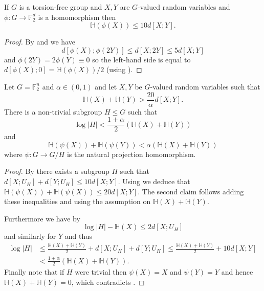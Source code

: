 \begin{lemma}\label{torsion-dist-shrinking}\leanok
If $G$ is a torsion-free group and $X,Y$ are $G$-valued random variables and $\phi:G\to \mathbb{F}_2^d$ is a homomorphism then
\[\mathbb{H}(\phi(X))\leq 10d[X;Y].\]
\end{lemma}
\begin{proof}
\leanok
By  and  we have
\[d[\phi(X);\phi(2Y)]\leq d[X;2Y]\leq 5d[X;Y]\]
and $\phi(2Y)=2\phi(Y)\equiv 0$ so the left-hand side is equal to $d[\phi(X);0]=\mathbb{H}(\phi(X))/2$ (using ).
\end{proof}

\begin{lemma}\label{app-ent-pfr}\leanok
Let $G=\mathbb{F}_2^n$ and $\alpha\in (0,1)$ and let $X,Y$ be $G$-valued
random variables such that
\[\mathbb{H}(X)+\mathbb{H}(Y)> \frac{20}{\alpha} d[X;Y].\]
There is a non-trivial subgroup $H\leq G$ such that
\[\log \lvert H\rvert <\frac{1+\alpha}{2}(\mathbb{H}(X)+\mathbb{H}(Y))\] and
\[\mathbb{H}(\psi(X))+\mathbb{H}(\psi(Y))< \alpha (\mathbb{H}(X)+\mathbb{H}(Y))\]
where $\psi:G\to G/H$ is the natural projection homomorphism.
\end{lemma}
\begin{proof}
\leanok
By  there exists a subgroup $H$ such that
$d[X;U_H] + d[Y;U_H] \leq 10 d[X;Y]$. Using  we
deduce that $\mathbb{H}(\psi(X)) + \mathbb{H}(\psi(X)) \leq 20 d[X;Y]$. The
second claim follows adding these inequalities and using the assumption on
$\mathbb{H}(X)+\mathbb{H}(Y)$.

Furthermore we have by 
\[\log \lvert H \rvert-\mathbb{H}(X)\leq 2d[X;U_H]\]
and similarly for $Y$ and thus
\begin{align*}
\log \lvert  H\rvert
&\leq
\frac{\mathbb{H}(X)+\mathbb{H}(Y)}{2}+d[X;U_H] + d[Y;U_H] \leq
\frac{\mathbb{H}(X)+\mathbb{H}(Y)}{2}+ 10d[X;Y]
\\& <
\frac{1+\alpha}{2}(\mathbb{H}(X)+\mathbb{H}(Y)).
\end{align*}
Finally note that if $H$
were trivial then $\psi(X)=X$ and $\psi(Y)=Y$ and hence
$\mathbb{H}(X)+\mathbb{H}(Y)=0$, which contradicts .
\end{proof}


